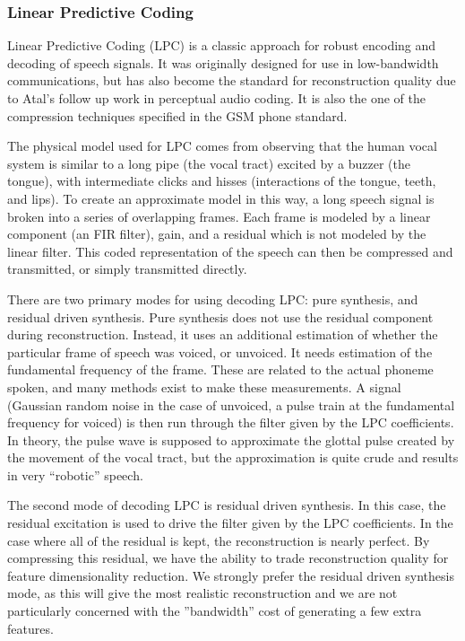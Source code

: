 \documentclass{article} %
\begin{document}
\subsubsection{Linear Predictive Coding}
Linear Predictive Coding (LPC) is a classic approach for robust
encoding and decoding of speech signals. It was originally designed for
use in low-bandwidth communications, but has also become the
standard for reconstruction quality due to Atal’s follow up work in perceptual
audio coding. It is also the one of the compression techniques specified in
the GSM phone standard. 
\par
The physical model used for LPC comes from observing that the human vocal
system is similar to a long pipe (the vocal tract) excited by a buzzer (the
tongue), with intermediate clicks and hisses (interactions of the tongue,
teeth, and lips). To create an approximate model in this way, a long speech
signal is broken into a series of overlapping frames. Each frame is modeled by
a linear component (an FIR filter), gain, and a residual which is not modeled
by the linear filter. This coded representation of the speech can then be
compressed and transmitted, or simply transmitted directly. 
\par
There are two primary modes for using decoding LPC: pure synthesis,
and residual driven synthesis. Pure synthesis does not use the residual
component during reconstruction. Instead, it uses an additional estimation of
whether the particular frame of speech was voiced, or unvoiced. It needs
estimation of the fundamental frequency of the frame. These are related to
the actual phoneme spoken, and many methods exist to make these measurements.
A signal (Gaussian random noise in the case of unvoiced, a pulse train at the
fundamental frequency for voiced) is then run through the filter given by the
LPC coefficients. In theory, the pulse wave is supposed to approximate
the glottal pulse created by the movement of the vocal tract, but the
approximation is quite crude and results in very “robotic” speech.
\par
The second mode of decoding LPC is residual driven synthesis. In this case,
the residual excitation is used to drive the filter given by the LPC
coefficients. In the case where all of the residual is kept, the
reconstruction is nearly perfect. By compressing this residual, we have the
ability to trade reconstruction quality for feature
dimensionality reduction. We strongly prefer the residual driven synthesis
mode, as this will give the most realistic reconstruction
and we are not particularly concerned with the ”bandwidth” cost of generating
a few extra features.
\end{document}
